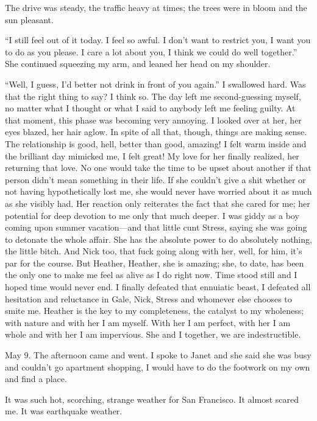 The drive was steady, the traffic heavy at times; the trees were in
bloom and the sun pleasant.

``I still feel out of it today. I feel so awful. I don't want to
restrict you, I want you to do as you please. I care a lot about you, I
think we could do well together.'' She continued squeezing my arm, and
leaned her head on my shoulder.

``Well, I guess, I'd better not drink in front of you again.'' I
swallowed hard. Was that the right thing to say? I think so. The day
left me second-guessing myself, no matter what I thought or what I said
to anybody left me feeling guilty. At that moment, this phase was
becoming very annoying. I looked over at her, her eyes blazed, her hair
aglow. In spite of all that, though, things are making sense. The
relationship is good, hell, better than good, amazing! I felt warm
inside and the brilliant day mimicked me, I felt great! My love for her
finally realized, her returning that love. No one would take the time to
be upset about another if that person didn't mean something in their
life. If she couldn't give a shit whether or not having hypothetically
lost me, she would never have worried about it as much as she visibly
had. Her reaction only reiterates the fact that she cared for me; her
potential for deep devotion to me only that much deeper. I was giddy as
a boy coming upon summer vacation---and that little cunt Stress, saying
she was going to detonate the whole affair. She has the absolute power
to do absolutely nothing, the little bitch. And Nick too, that fuck
going along with her, well, for him, it's par for the course. But
Heather, Heather, she is amazing; she, to date, has been the only one to
make me feel as alive as I do right now. Time stood still and I hoped
time would never end. I finally defeated that ennuiatic beast, I
defeated all hesitation and reluctance in Gale, Nick, Stress and
whomever else chooses to smite me. Heather is the key to my
completeness, the catalyst to my wholeness; with nature and with her I
am myself. With her I am perfect, with her I am whole and with her I am
impervious. She and I together, we are indestructible.

May 9. The afternoon came and went. I spoke to Janet and she said she
was busy and couldn't go apartment shopping, I would have to do the
footwork on my own and find a place.

It was such hot, scorching, strange weather for San Francisco. It almost
scared me. It was earthquake weather.

